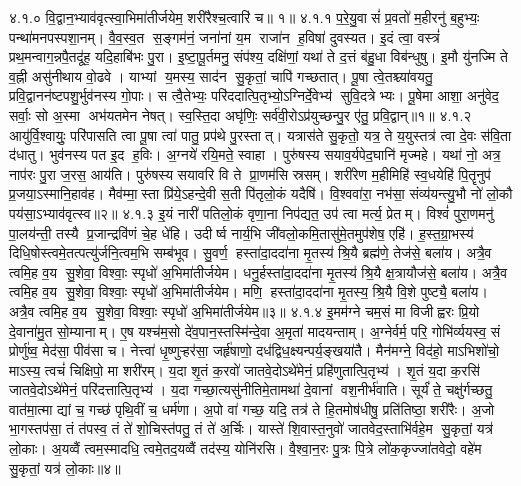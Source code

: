 ४.१.०
वि॒द्वान॒भ्याव॑वृत्स्वा॒भिमा॑तीर्जयेम॒ शरी॑रैश्च॒त्वारि॑ च॥ १॥
४.१.१
प॒रे॒यु॒वासं॑ प्र॒वतो॑ म॒हीरनु॑ ब॒हुभ्यः॒ पन्था॑मनपस्पशा॒नम्। वै॒व॒स्व॒त स॒ङ्गम॑नं॒ जना॑नां य॒म राजा॑न ह॒विषा॑ दुवस्यत। इ॒दं त्वा॒ वस्त्रं॑ प्रथ॒मन्वाग॒न्नपै॒तदू॑ह॒ यदि॒हाबि॑भः पु॒रा। इ॒ष्टा॒पू॒र्तमनु॒ संप॑श्य॒ दक्षि॑णां॒ यथा॑ ते द॒त्तं ब॑हु॒धा विब॑न्धुषु। इ॒मौ यु॑नज्मि ते व॒ह्नी असु॑नीथाय वो॒ढवे। याभ्यां य॒मस्य॒ साद॑न सु॒कृतां॒ चापि॑ गच्छतात्। पू॒षा त्वे॒तश्च्या॑वयतु॒ प्रवि॒द्वानन॑ष्टपशु॒र्भुव॑नस्य गो॒पाः। स त्वै॒तेभ्यः॒ परि॑ददात्पि॒तृभ्यो॒ऽग्निर्दे॒वेभ्य॑ सुवि॒दत्रेभ्यः। पू॒षेमा आशा॒ अनु॑वेद॒ सर्वाः॒ सो अ॒स्मा अभ॑यतमेन नेषत्। स्व॒स्ति॒दा अघृ॑णिः॒ सर्व॑वी॒रोऽप्र॑युच्छन्पु॒र ए॑तु॒ प्रवि॒द्वान्॥१॥
४.१.२
आयु॑र्वि॒श्वायुः॒ परि॑पासति त्वा पू॒षा त्वा॑ पातु॒ प्रप॑थे पु॒रस्तात्। यत्रास॑ते सु॒कृतो॒ यत्र॒ ते य॒युस्तत्र॑ त्वा दे॒वः स॑वि॒ता द॑धातु। भुव॑नस्य पत इ॒द ह॒विः। अ॒ग्नये॑ रयि॒मते॒ स्वाहा। पुरु॑षस्य सयाव॒र्यपेद॒घानि॑ मृज्महे। यथा॑ नो॒ अत्र॒ नाप॑रः पु॒रा ज॒रस॒ आय॑ति। पुरु॑षस्य सयावरि वि ते प्रा॒णम॑सि स्रसम्। शरी॑रेण म॒हीमिहि॑ स्व॒धयेहि॑ पि॒तॄनुप॑ प्र॒जया॒ऽस्मानि॒हाव॑ह। मैव॑म्मा॒स्ता प्रि॑ये॒ऽहन्दे॒वी स॒ती पि॑तृलो॒कं यदैषि॑। वि॒श्ववा॑रा॒ नभ॑सा॒ संव्य॑यन्त्यु॒भौ नो॑ लो॒कौ पय॑सा॒ऽभ्याव॑वृत्स्व॥२॥
४.१.३
इ॒यं नारी॑ पतिलो॒कं वृणा॒ना निप॑द्यत॒ उप॑ त्वा मर्त्य॒ प्रेतम्। विश्वं॑ पुरा॒णमनु॑ पा॒लय॑न्ती॒ तस्यै प्र॒जान्द्रवि॑णं चे॒ह धे॑हि। उदीर्ष्व नार्य॒भि जी॑वलो॒कमि॒तासु॑मे॒तमुप॑शेष॒ एहि॑। ह॒स्त॒ग्रा॒भस्य॑ दिधि॒षोस्त्वमे॒तत्पत्यु॑र्जनि॒त्वम॒भि सम्ब॑भूव। सु॒वर्ण॒ हस्ता॑दा॒ददा॑ना मृ॒तस्य॑ श्रि॒यै ब्रह्म॑णे॒ तेज॑से॒ बला॑य। अत्रै॒व त्वमि॒ह व॒य सु॒शेवा॒ विश्वाः॒ स्पृधो॑ अ॒भिमा॑तीर्जयेम। धनु॒र्\mbox{}हस्ता॑दा॒ददा॑ना मृ॒तस्य॑ श्रि॒यै क्ष॒त्रायौज॑से॒ बला॑य। अत्रै॒व त्वमि॒ह व॒य सु॒शेवा॒ विश्वाः॒ स्पृधो॑ अ॒भिमा॑तीर्जयेम। मणि॒ हस्ता॑दा॒ददा॑ना मृ॒तस्य॒ श्रि॒यै वि॒शे पुष्ट्यै॒ बला॑य। अत्रै॒व त्वमि॒ह व॒य सु॒शेवा॒ विश्वाः॒ स्पृधो॑ अ॒भिमा॑तीर्जयेम॥३॥
४.१.४
इ॒मम॑ग्ने चम॒सं मा विजीह्वरः प्रि॒यो दे॒वाना॑मु॒त सो॒म्यानाम्। ए॒ष यश्च॑म॒सो दे॑व॒पान॒स्तस्मि॑न्दे॒वा अ॒मृता॑ मादयन्ताम्। अ॒ग्नेर्वर्म॒ परि॒ गोभि॑र्व्ययस्व॒ सं प्रोर्णु॑ष्व॒ मेद॑सा॒ पीव॑सा च। नेत्त्वा॑ धृ॒ष्णुऱ्\mbox{}हर॑सा॒ जर्\mbox{}हृ॑षाणो॒ दध॑द्विध॒क्ष्यन्पर्य॒ङ्खया॑तै। मैन॑मग्ने॒ विद॑हो॒ माऽभिशो॑चो॒ माऽस्य॒ त्वचं॑ चिक्षिपो॒ मा शरी॑रम्। य॒दा शृ॒तं क॒रवो॑ जातवे॒दोऽथे॑मेनं॒ प्रहि॑णुतात्पि॒तृभ्य॑। शृ॒तं य॒दा क॒रसि॑ जातवे॒दोऽथे॑मेनं॒ परि॑दत्तात्पि॒तृभ्य॑। य॒दा गच्छा॒त्यसु॑नीतिमे॒तामथा॑ दे॒वानां वश॒नीर्भ॑वाति। सूर्यं॑ ते॒ चक्षु॑र्गच्छतु॒ वात॑मा॒त्मा द्यां च॒ गच्छ॑ पृथि॒वीं च॒ धर्म॑णा। अ॒पो वा॑ गच्छ॒ यदि॒ तत्र॑ ते हि॒तमोष॑धीषु॒ प्रति॑तिष्ठा॒ शरी॑रैः। अ॒जो भा॒गस्तप॑सा॒ तं त॑पस्व॒ तं ते॑ शो॒चिस्त॑पतु॒ तं ते॑ अ॒र्चिः। यास्ते॑ शि॒वास्त॒नुवो॑ जातवेद॒स्ताभि॑र्वहे॒म सु॒कृतां॒ यत्र॑ लो॒काः। अ॒यव्वैं त्वम॒स्मादधि॒ त्वमे॒तद॒यव्वैं तद॑स्य॒ योनि॑रसि। वै॒श्वा॒न॒रः पु॒त्रः पि॒त्रे लो॑क॒कृज्जा॑तवेदो॒ वहे॑म सु॒कृतां॒ यत्र॑ लो॒काः॥४॥
\anuvakamend

